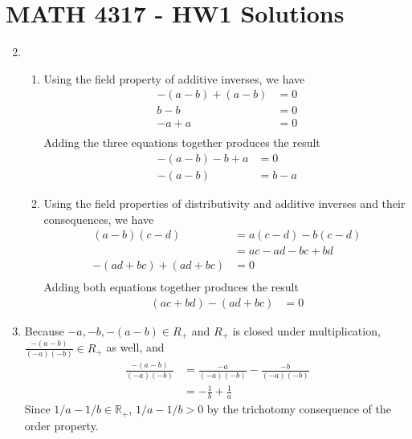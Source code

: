 \documentclass[a4paper,12pt]{article}
\begin{document}
    \section*{MATH 4317 - HW1 Solutions}

    \begin{enumerate}

            \setcounter{enumi}{1}
            \item
                \begin{enumerate}
                    \item Using the field property of additive inverses, we have
                    \begin{align*}
                        -(a - b) + (a - b) &= 0 \\
                        b - b &= 0 \\
                        -a + a &= 0 \\
                    \end{align*}
                    Adding the three equations together produces the result
                    \begin{align*}
                        -(a - b) - b + a &= 0 \\
                        -(a - b) &= b - a
                    \end{align*}

                    \item Using the field properties of distributivity and additive inverses and their consequences, we have
                    \begin{align*}
                        (a - b)(c - d) &= a(c - d) - b(c - d) \\
                        &= ac - ad - bc + bd \\
                        -(ad + bc) + (ad + bc) &= 0 \\
                    \end{align*}
                    Adding both equations together produces the result
                    \begin{align*}
                        (ac + bd) - (ad + bc) &= 0
                    \end{align*}
                \end{enumerate}

            \item Because $-a, -b, -(a - b) \in {R}_+$ and ${R}_+$ is closed under multiplication, $\frac{-(a - b)}{(-a)(-b)} \in {R}_+$ as well, and 
            \begin{align*}
                \frac{-(a - b)}{(-a)(-b)} &= \frac{-a}{(-a)(-b)} - \frac{-b}{(-a)(-b)} \\
                &= -\frac{1}{b} + \frac{1}{a} 
            \end{align*}
            Since $1/a - 1/b \in \mathbb{R}_+$, $1/a - 1/b > 0$ by the trichotomy consequence of the order property.



\end{enumerate}
\end{document}
